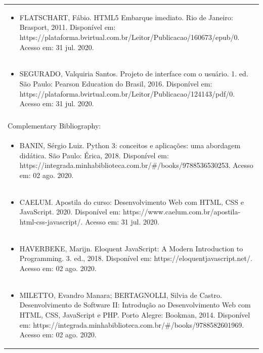 \documentclass[11pt]{article}
\begin{document}
\begin{center}
\begin{longtable}{|p{4cm}|p{4cm}|p{4cm}|p{4cm}|}
\multicolumn{4}{|p{\dimexpr 16cm + 6\tabcolsep\relax}|}{\begin{itemize}\item FLATSCHART, Fábio. HTML5 Embarque imediato. Rio de Janeiro: Brasport, 2011. Disponível em: https://plataforma.bvirtual.com.br/Leitor/Publicacao/160673/epub/0. Acesso em: 31 jul. 2020.\end{itemize}}\\
\multicolumn{4}{|p{\dimexpr 16cm + 6\tabcolsep\relax}|}{\begin{itemize}\item SEGURADO, Valquiria Santos. Projeto de interface com o usuário. 1. ed. São Paulo: Pearson Education do Brasil, 2016. Disponível em: https://plataforma.bvirtual.com.br/Leitor/Publicacao/124143/pdf/0. Acesso em: 31 jul. 2020.\end{itemize}}\\
\multicolumn{4}{|p{16cm}|}{}\\
\hline
\multicolumn{4}{|p{16cm}|}{Complementary Bibliography:}\\*
\multicolumn{4}{|p{\dimexpr 16cm + 6\tabcolsep\relax}|}{\begin{itemize}\item BANIN, Sérgio Luiz. Python 3: conceitos e aplicações: uma abordagem didática. São Paulo: Érica, 2018. Disponível em: https://integrada.minhabiblioteca.com.br/\#/books/9788536530253. Acesso em: 02 ago. 2020.\end{itemize}}\\
\multicolumn{4}{|p{\dimexpr 16cm + 6\tabcolsep\relax}|}{\begin{itemize}\item CAELUM. Apostila do curso: Desenvolvimento Web com HTML, CSS e JavaScript. 2020. Disponível em: https://www.caelum.com.br/apostila-html-css-javascript/. Acesso em: 31 jul. 2020.\end{itemize}}\\
\multicolumn{4}{|p{\dimexpr 16cm + 6\tabcolsep\relax}|}{\begin{itemize}\item HAVERBEKE, Marijn. Eloquent JavaScript: A Modern Introduction to Programming. 3. ed., 2018. Disponível em: https://eloquentjavascript.net/. Acesso em: 02 ago. 2020.\end{itemize}}\\
\multicolumn{4}{|p{\dimexpr 16cm + 6\tabcolsep\relax}|}{\begin{itemize}\item MILETTO, Evandro Manara; BERTAGNOLLI, Silvia de Castro. Desenvolvimento de Software II: Introdução ao Desenvolvimento Web com HTML, CSS, JavaScript e PHP. Porto Alegre: Bookman, 2014. Disponível em: https://integrada.minhabiblioteca.com.br/\#/books/9788582601969. Acesso em: 02 ago. 2020.\end{itemize}}\\

\end{longtable}
\end{center}
\end{document}

